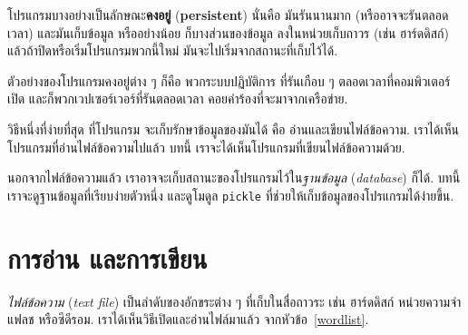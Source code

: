 โปรแกรมบางอย่างเป็นลักษณะ\textbf{คงอยู่} (\textbf{persistent})
นั่นคือ มันรันนานมาก (หรืออาจจะรันตลอดเวลา)
และมันเก็บข้อมูล หรืออย่างน้อย ก็บางส่วนของข้อมูล ลงในหน่วยเก็บถาวร (เช่น ฮาร์ดดิสก์)
แล้วถ้าปิดหรือเริ่มโปรแกรมพวกนี้ใหม่
มันจะไปเริ่มจากสถานะที่เก็บไว้ได้.


ตัวอย่างของโปรแกรมคงอยู่ต่าง ๆ ก็คือ พวกระบบปฏิบัติการ
ที่รันเกือบ ๆ ตลอดเวลาที่คอมพิวเตอร์เปิด
และก็พวกเวปเซอร์เวอร์ที่รันตลอดเวลา คอยคำร้องที่จะมาจากเครือข่าย.


วิธีหนึ่งที่ง่ายที่สุด ที่โปรแกรม จะเก็บรักษาข้อมูลของมันได้ คือ อ่านและเขียนไฟล์ข้อความ.
เราได้เห็นโปรแกรมที่อ่านไฟล์ข้อความไปแล้ว
บทนี้ เราจะได้เห็นโปรแกรมที่เขียนไฟล์ข้อความด้วย.


นอกจากไฟล์ข้อความแล้ว เราอาจจะเก็บสถานะของโปรแกรมไว้ใน\textit{ฐานข้อมูล} (\textit{database}) ก็ได้.
บทนี้ เราจะดูฐานข้อมูลที่เรียบง่ายตัวหนึ่ง และดูโมดูล \texttt{pickle}
ที่ช่วยให้เก็บข้อมูลของโปรแกรมได้ง่ายขึ้น.

\section{การอ่าน และการเขียน}



\textit{ไฟล์ข้อความ} (\textit{text file})
เป็นลำดับของอักขระต่าง ๆ ที่เก็บในสื่อถาวระ เช่น ฮาร์ดดิสก์ หน่วยความจำแฟลช หรือซีดีรอม.
เราได้เห็นวิธีเปิดและอ่านไฟล์มาแล้ว จากหัวข้อ~\ref{wordlist}.

